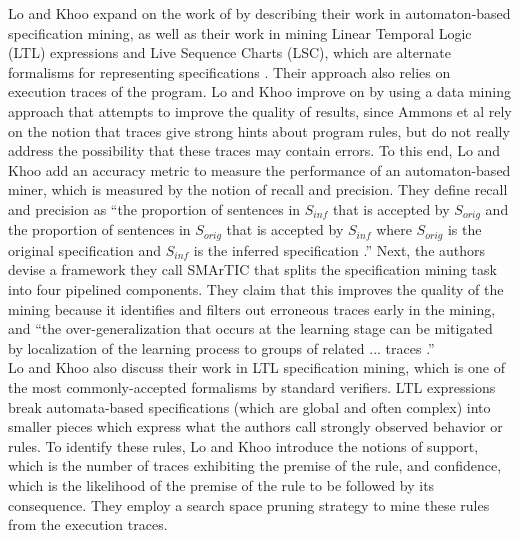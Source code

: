\documentclass[12pt]{article}
\begin{document}
\noindent Lo and Khoo expand on the work of \cite{Ammons:2002:MS:503272.503275}
by describing their work in automaton-based specification mining, as well as
their work in mining Linear Temporal Logic (LTL) expressions and Live Sequence
Charts (LSC), which are alternate formalisms for representing specifications
\cite{Lo_softwarespecification}. Their approach also relies on execution traces
of the program. Lo and Khoo improve on \cite{Ammons:2002:MS:503272.503275} by
using a data mining approach that attempts to improve the quality of results,
since Ammons et al rely on the notion that traces give strong hints about
program rules, but do not really address the possibility that these traces may
contain errors. To this end, Lo and Khoo add an accuracy metric to measure the
performance of an automaton-based miner, which is measured by the notion of
recall and precision. They define recall and precision as ``the proportion of
sentences in $S_{inf}$ that is accepted by $S_{orig}$ and the proportion of
sentences in $S_{orig}$ that is accepted by $S_{inf}$ where $S_{orig}$ is the
original specification and $S_{inf}$ is the inferred specification
\cite{Lo_softwarespecification}.'' Next, the authors devise a framework they
call SMArTIC that splits the specification mining task into four pipelined
components. They claim that this improves the quality of the mining because it
identifies and filters out erroneous traces early in the mining, and ``the
over-generalization that occurs at the learning stage can be mitigated by
localization of the learning process to groups of related ... traces
\cite{Lo_softwarespecification}.''
\\

\noindent Lo and Khoo also discuss their work in LTL specification mining,
which is one of the most commonly-accepted formalisms by standard verifiers.
LTL expressions break automata-based specifications (which are global and
often complex) into smaller pieces which express what the authors call
strongly observed behavior or rules. To identify these rules, Lo and Khoo
introduce the notions of support, which is the number of traces exhibiting the
premise of the rule, and confidence, which is the likelihood of the premise of
the rule to be followed by its consequence\cite{Lo_softwarespecification}.
They employ a search space pruning strategy to mine these rules from the
execution traces.
\end{document}
